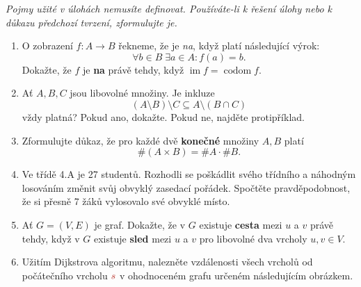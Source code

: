 \documentclass[a4paper,11pt]{article}
\DeclareMathOperator{\img}{im}
\DeclareMathOperator{\codom}{codom}
\begin{document}
 \begin{tcolorbox}[title=\textsf{Lehké úlohy a důkazy (6
  bodů)},arc=0mm,boxsep=3mm,bottomrule=1pt,toprule=1pt,leftrule=-0.1mm,
  rightrule=-0.1mm,colframe=Emerald!80!white,colback=Emerald!5!white]
  \emph{Pojmy užité v úlohách nemusíte definovat. Používáte-li k řešení úlohy
  nebo k důkazu předchozí tvrzení, zformulujte je.}
  \begin{enumerate}
   \item O zobrazení $f: A \to B$ řekneme, že je \emph{na}, když platí
    následující výrok:
    \[
     \forall b \in B \; \exists a \in A: f(a) = b.
    \]
    Dokažte, že $f$ je \textbf{na} právě tehdy, když $\img f = \codom f$.
   \item Ať $A,B,C$ jsou libovolné množiny. Je inkluze
   \[
    (A \setminus B) \setminus C \subseteq A \setminus (B \cap C)
   \]
   vždy platná? Pokud ano, dokažte. Pokud ne, najděte protipříklad.
  \item Zformulujte důkaz, že pro každé dvě \textbf{konečné} množiny $A,B$ platí
   \[
    \# (A \times B) = \# A \cdot \# B.
   \]
  \item Ve třídě 4.A je 27 studentů. Rozhodli se poškádlit svého třídního a
   náhodným losováním změnit svůj obvyklý zasedací pořádek. Spočtěte
   pravděpodobnost, že si přesně 7 žáků vylosovalo své obvyklé místo.
  \item Ať $G = (V,E)$ je graf. Dokažte, že v $G$ existuje \textbf{cesta} mezi
   $u$ a $v$ právě tehdy, když v $G$ existuje \textbf{sled} mezi $u$ a $v$ pro
   libovolné dva vrcholy $u,v \in V$.
  \item Užitím Dijkstrova algoritmu, nalezněte vzdálenosti všech vrcholů od
   počátečního vrcholu $\textcolor{BrickRed}{s}$ v ohodnoceném grafu určeném
   následujícím obrázkem.
   \begin{center}
\end{center}
\end{enumerate}
\end{tcolorbox}
\end{document}
